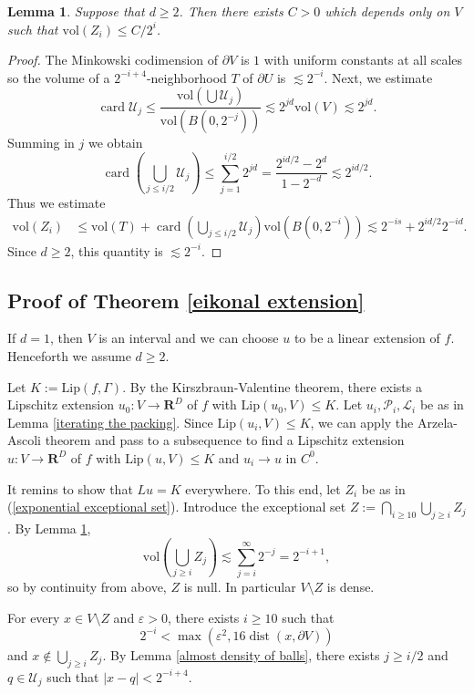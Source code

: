 \documentclass[reqno,11pt]{amsart}
\newcommand{\RR}{\mathbf{R}}
\DeclareMathOperator{\card}{card}
\DeclareMathOperator{\dist}{dist}
\newcommand{\vol}{\mathrm{vol}}
\newcommand{\Lip}{\mathrm{Lip}}
\newtheorem{lemma}[theorem]{Lemma}
\theoremstyle{definition}
\numberwithin{equation}{section}
\begin{document}
\begin{lemma}\label{decay of the exceptional set}
Suppose that $d \geq 2$.
Then there exists $C > 0$ which depends only on $V$ such that $\vol(Z_i) \leq C/2^i$.
\end{lemma}
\begin{proof}
The Minkowski codimension of $\partial V$ is $1$ with uniform constants at all scales so the volume of a $2^{-i+4}$-neighborhood $T$ of $\partial U$ is $\lesssim 2^{-i}$.
Next, we estimate
$$\card \mathscr U_j \leq \frac{\vol(\bigcup \mathscr U_j)}{\vol(B(0, 2^{-j}))} \lesssim 2^{jd} \vol(V) \lesssim 2^{jd}.$$
Summing in $j$ we obtain 
$$\card\left(\bigcup_{j \leq i/2} \mathscr U_j\right) \leq \sum_{j=1}^{i/2} 2^{jd} = \frac{2^{id/2} - 2^d}{1 - 2^{-d}} \lesssim 2^{id/2}.$$
Thus we estimate
\begin{align*}
\vol(Z_i)
&\leq \vol(T) + \card\left(\bigcup_{j \leq i/2} \mathscr U_j\right) \vol(B(0, 2^{-i})) 
\lesssim 2^{-is} + 2^{id/2} 2^{-id}.
\end{align*}
Since $d \geq 2$, this quantity is $\lesssim 2^{-i}$.
\end{proof}

\subsection{Proof of Theorem \ref{eikonal extension}}
If $d = 1$, then $V$ is an interval and we can choose $u$ to be a linear extension of $f$.
Henceforth we assume $d \geq 2$.

Let $K := \Lip(f, \Gamma)$.
By the Kirszbraun-Valentine theorem, there exists a Lipschitz extension $u_0: V \to \RR^D$ of $f$ with $\Lip(u_0, V) \leq K$.
Let $u_i, \mathscr P_i, \mathscr L_i$ be as in Lemma \ref{iterating the packing}.
Since $\Lip(u_i, V) \leq K$, we can apply the Arzela-Ascoli theorem and pass to a subsequence to find a Lipschitz extension $u: V \to \RR^D$ of $f$ with $\Lip(u, V) \leq K$ and $u_i \to u$ in $C^0$.

It remins to show that $Lu = K$ everywhere.
To this end, let $Z_i$ be as in (\ref{exponential exceptional set}).
Introduce the exceptional set $Z := \bigcap_{i \geq 10} \bigcup_{j \geq i} Z_j$.
By Lemma \ref{decay of the exceptional set},
$$\vol\left(\bigcup_{j \geq i} Z_j\right) \lesssim \sum_{j = i}^\infty 2^{-j} = 2^{-i + 1},$$
so by continuity from above, $Z$ is null.
In particular $V \setminus Z$ is dense.

For every $x \in V \setminus Z$ and $\varepsilon > 0$, there exists $i \geq 10$ such that
$$2^{-i} < \max(\varepsilon^2, 16 \dist(x, \partial V))$$
and $x \notin \bigcup_{j \geq i} Z_j$.
By Lemma \ref{almost density of balls}, there exists $j \geq i/2$ and $q \in \mathscr U_j$ such that $|x - q| < 2^{-i + 4}$.
\end{document}
